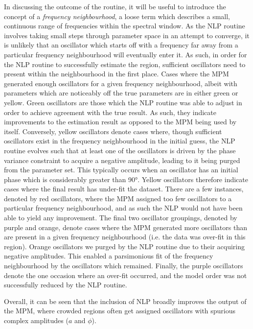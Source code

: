 In discussing the outcome of the routine, it will be useful to introduce the
concept of a \emph{frequency neighbourhood}, a loose term which describes a
small, continuous range of frequencies within the spectral window. As the
\ac{NLP} routine involves taking small steps
through parameter space in an attempt to converge, it is unlikely that an
oscillator which starts off with a frequency far away from a particular
frequency neighbourhood will eventually enter it.  As such, in order for the
\ac{NLP} routine to successfully estimate the region, sufficient oscillators
need to present within the neighbourhood in the first place. Cases where the
\ac{MPM} generated enough oscillators for a given frequency neighbourhood,
albeit with parameters which are noticeably off the true parameters are in
either green or yellow. Green oscillators are those which the \ac{NLP} routine
was able to adjust in order to achieve agreement with the true result. As such,
they indicate improvements to the estimation result as opposed to the \ac{MPM}
being used by itself. Conversely, yellow oscillators denote cases where, though
sufficient oscillators exist in the frequency neighbourhood in the initial
guess, the \ac{NLP} routine evolves such that at least one of the oscillators
is driven by the phase variance constraint to acquire a negative amplitude,
leading to it being purged from the parameter set. This typically occurs when an
oscillator has an initial phase which is considerably greater than \ang{90}.
Yellow oscillators therefore indicate cases where the final result has
under-fit the dataset. There are a few instances, denoted by red oscillators,
where the \ac{MPM} assigned too few oscillators to a particular frequency
neighbourhood, and as such the \ac{NLP} would not have been able to yield any
improvement.
The final two oscillator groupings, denoted by purple and orange, denote cases
where the \ac{MPM} generated more oscillators than are present in a given
frequency neighbourhood (i.e. the data was over-fit in this region). Orange
oscillators we purged by the \ac{NLP} routine due to their acquiring negative
amplitudes. This enabled a parsimonious fit of the frequency neighbourhood by
the oscillators which remained. Finally, the purple oscillators denote the one
occasion where an over-fit occurred, and the model order was not successfully
reduced by the \ac{NLP} routine.

Overall, it can be seen that the inclusion of \ac{NLP} broadly improves the
output of the \ac{MPM}, where crowded regions often get assigned oscillators
with spurious complex amplitudes ($a$ and  $\phi$). 

